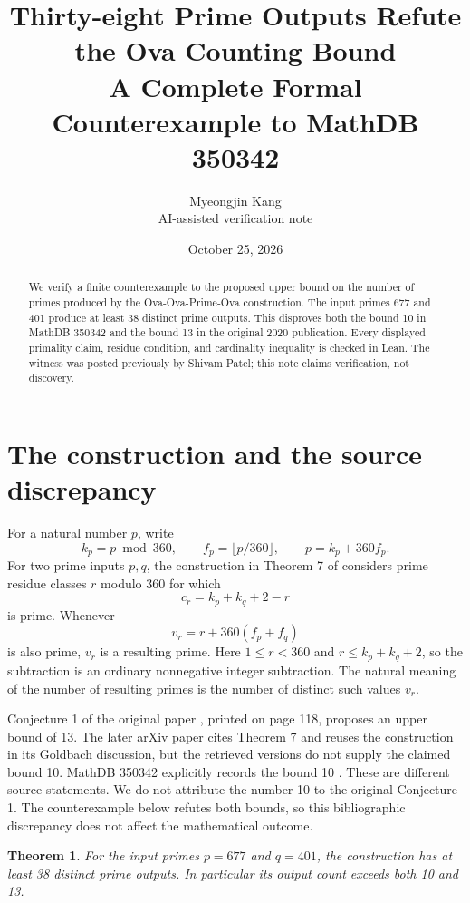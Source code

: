 \documentclass[11pt]{article}
\title{Thirty-eight Prime Outputs Refute the Ova Counting Bound\\A Complete Formal Counterexample to MathDB 350342}
\author{Myeongjin Kang\\\small AI-assisted verification note}
\date{October 25, 2026}
\newtheorem{theorem}{Theorem}
\begin{document}
\maketitle
\begin{abstract}
We verify a finite counterexample to the proposed upper bound on the number of primes produced by the Ova-Ova-Prime-Ova construction. The input primes 677 and 401 produce at least 38 distinct prime outputs. This disproves both the bound 10 in MathDB 350342 and the bound 13 in the original 2020 publication. Every displayed primality claim, residue condition, and cardinality inequality is checked in Lean. The witness was posted previously by Shivam Patel; this note claims verification, not discovery.
\end{abstract}

\section{The construction and the source discrepancy}
For a natural number $p$, write
\[
 k_p=p\bmod360,\qquad f_p=\lfloor p/360\rfloor,
 \qquad p=k_p+360f_p.
\]
For two prime inputs $p,q$, the construction in Theorem 7 of \cite{A2020} considers prime residue classes $r$ modulo 360 for which
\[
 c_r=k_p+k_q+2-r
\]
is prime. Whenever
\[
 v_r=r+360(f_p+f_q)
\]
is also prime, $v_r$ is a resulting prime. Here $1\leq r<360$ and $r\leq k_p+k_q+2$, so the subtraction is an ordinary nonnegative integer subtraction. The natural meaning of the number of resulting primes is the number of distinct such values $v_r$.

Conjecture 1 of the original paper \cite{A2020}, printed on page 118, proposes an upper bound of 13. The later arXiv paper \cite{A2021} cites Theorem 7 and reuses the construction in its Goldbach discussion, but the retrieved versions do not supply the claimed bound 10. MathDB 350342 explicitly records the bound 10 \cite{DB}. These are different source statements. We do not attribute the number 10 to the original Conjecture 1. The counterexample below refutes both bounds, so this bibliographic discrepancy does not affect the mathematical outcome.

\begin{theorem}\label{thm:main}
For the input primes $p=677$ and $q=401$, the construction has at least 38 distinct prime outputs. In particular its output count exceeds both 10 and 13.
\end{theorem}
\end{document}
